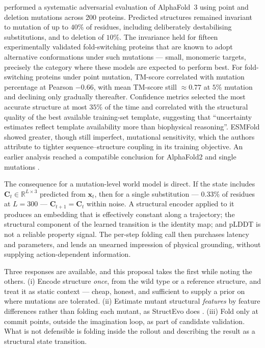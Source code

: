 \documentclass[12pt, a4paper]{article}
\begin{document}
\citet{feldman2026invariance} performed a systematic adversarial evaluation of AlphaFold~3 using point and deletion mutations across 200 proteins. Predicted structures remained invariant to mutation of up to $40\%$ of residues, including deliberately destabilising substitutions, and to deletion of $10\%$. The invariance held for fifteen experimentally validated fold-switching proteins that are known to adopt alternative conformations under such mutations --- small, monomeric targets, precisely the category where these models are expected to perform best. For fold-switching proteins under point mutation, TM-score correlated with mutation percentage at Pearson $-0.66$, with mean TM-score still $\approx 0.77$ at $5\%$ mutation and declining only gradually thereafter. Confidence metrics selected the most accurate structure at most $35\%$ of the time and correlated with the structural quality of the best available training-set template, suggesting that ``uncertainty estimates reflect template availability more than biophysical reasoning''. ESMFold showed greater, though still imperfect, mutational sensitivity, which the authors attribute to tighter sequence--structure coupling in its training objective. An earlier analysis reached a compatible conclusion for AlphaFold2 and single mutations \citep{pak2023alphafold_mutations}.

The consequence for a mutation-level world model is direct. If the state includes $\mathbf{C}_t \in \mathbb{R}^{L \times 3}$ predicted from $\mathbf{x}_t$, then for a single substitution --- $0.33\%$ of residues at $L=300$ --- $\mathbf{C}_{t+1} = \mathbf{C}_t$ within noise. A structural encoder applied to it produces an embedding that is effectively constant along a trajectory; the structural component of the learned transition is the identity map; and pLDDT is not a reliable property signal. The per-step folding call then purchases latency and parameters, and lends an unearned impression of physical grounding, without supplying action-dependent information.

Three responses are available, and this proposal takes the first while noting the others. (i) Encode structure \textit{once}, from the wild type or a reference structure, and treat it as static context --- cheap, honest, and sufficient to supply a prior on where mutations are tolerated. (ii) Estimate mutant structural \textit{features} by feature differences rather than folding each mutant, as StructEvo does \citep{nie2026structevo}. (iii) Fold only at commit points, outside the imagination loop, as part of candidate validation. What is not defensible is folding inside the rollout and describing the result as a structural state transition.
\end{document}

